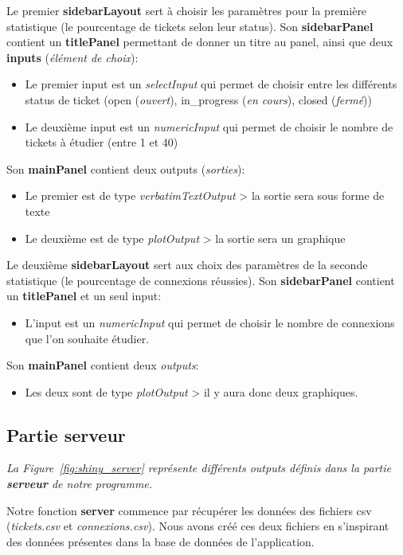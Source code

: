 \documentclass[12pt, a4paper]{article}
\begin{document}
Le premier \textbf{sidebarLayout} sert à choisir les paramètres pour la première statistique (le pourcentage de tickets selon leur status).
Son \textbf{sidebarPanel} contient un \textbf{titlePanel} permettant de donner un titre au panel, ainsi que deux \textbf{inputs} (\textit{élément de choix}):
\begin{itemize}
    \item Le premier input est un \textit{selectInput} qui permet de choisir entre les différents status de ticket
    (open (\textit{ouvert}), in\_progress (\textit{en cours}), closed (\textit{fermé}))
    \item Le deuxième input est un \textit{numericInput} qui permet de choisir le nombre de tickets à étudier (entre 1 et 40)
\end{itemize}
Son \textbf{mainPanel} contient deux outputs (\textit{sorties}):
\begin{itemize}
    \item Le premier est de type \textit{verbatimTextOutput} > la sortie sera sous forme de texte
    \item Le deuxième est de type \textit{plotOutput} > la sortie sera un graphique
\end{itemize}
\bigskip

Le deuxième \textbf{sidebarLayout} sert aux choix des paramètres de la seconde statistique (le pourcentage de connexions réussies).
Son \textbf{sidebarPanel} contient un \textbf{titlePanel} et un seul input:
\begin{itemize}
    \item L'input est un \textit{numericInput}  qui permet de choisir le nombre de connexions que l'on souhaite étudier.
\end{itemize}
Son \textbf{mainPanel} contient deux \textit{outputs}:
\begin{itemize}
    \item Les deux sont de type \textit{plotOutput} > il y aura donc deux graphiques.
\end{itemize}

\subsection*{Partie serveur}

\noindent \textit{La Figure~\ref{fig:shiny_server} représente différents outputs définis dans la partie \textbf{serveur} de notre programme.}
\bigskip

Notre fonction \textbf{server} commence par récupérer les données des fichiers csv (\textit{tickets.csv} et \textit{connexions.csv}).
Nous avons créé ces deux fichiers en s'inspirant des données présentes dans la base de données de l'application.
\end{document}
